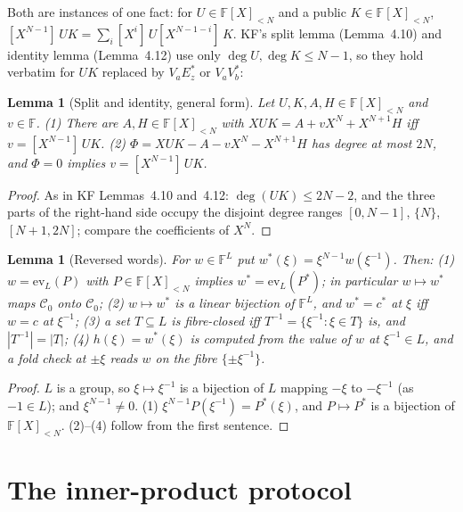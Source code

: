 \documentclass[11pt]{article}
\newtheorem{lemma}[theorem]{Lemma}
\theoremstyle{definition}
\newcommand{\F}{\mathbb{F}}
\newcommand{\coef}[2]{[X^{#1}]\,#2}
\newcommand{\ev}{\mathrm{ev}}
\newcommand{\Cc}{\mathcal{C}}
\newcommand{\iv}[2]{[#1,#2]}
\begin{document}
Both are instances of one fact: for $U\in\F[X]_{<N}$ and a public $K\in\F[X]_{<N}$, $\coef{N-1}{UK}=\sum_i\coef{i}{U}\coef{N-1-i}{K}$.
KF's split lemma (Lemma~4.10) and identity lemma (Lemma~4.12) use only $\deg U,\deg K\le N-1$, so they hold verbatim for $UK$ replaced by $V_aE^\ast_z$ or $V_aV_b^\ast$:

\begin{lemma}[Split and identity, general form]\label{lem:gen-identity}
Let $U,K,A,H\in\F[X]_{<N}$ and $v\in\F$.
(1) There are $A,H\in\F[X]_{<N}$ with $XUK=A+vX^N+X^{N+1}H$ iff $v=\coef{N-1}{UK}$.
(2) $\Phi=XUK-A-vX^N-X^{N+1}H$ has degree at most $2N$, and $\Phi=0$ implies $v=\coef{N-1}{UK}$.
\end{lemma}
\begin{proof}
As in KF Lemmas~4.10 and~4.12: $\deg(UK)\le2N-2$, and the three parts of the right-hand side occupy the disjoint degree ranges $\iv{0}{N-1}$, $\{N\}$, $\iv{N+1}{2N}$; compare the coefficients of $X^N$.
\end{proof}

\begin{lemma}[Reversed words]\label{lem:rev}
For $w\in\F^L$ put $w^\ast(\xi)=\xi^{N-1}w(\xi^{-1})$. Then:
(1) $w=\ev_L(P)$ with $P\in\F[X]_{<N}$ implies $w^\ast=\ev_L(P^\ast)$; in particular $w\mapsto w^\ast$ maps $\Cc_0$ onto $\Cc_0$;
(2) $w\mapsto w^\ast$ is a linear bijection of $\F^L$, and $w^\ast=c^\ast$ at $\xi$ iff $w=c$ at $\xi^{-1}$;
(3) a set $T\subseteq L$ is fibre-closed iff $T^{-1}=\{\xi^{-1}:\xi\in T\}$ is, and $|T^{-1}|=|T|$;
(4) $h(\xi)=w^\ast(\xi)$ is computed from the value of $w$ at $\xi^{-1}\in L$, and a fold check at $\pm\xi$ reads $w$ on the fibre $\{\pm\xi^{-1}\}$.
\end{lemma}
\begin{proof}
$L$ is a group, so $\xi\mapsto\xi^{-1}$ is a bijection of $L$ mapping $-\xi$ to $-\xi^{-1}$ (as $-1\in L$); and $\xi^{N-1}\ne0$.
(1) $\xi^{N-1}P(\xi^{-1})=P^\ast(\xi)$, and $P\mapsto P^\ast$ is a bijection of $\F[X]_{<N}$. (2)--(4) follow from the first sentence.
\end{proof}

\section{The inner-product protocol}
\end{document}
